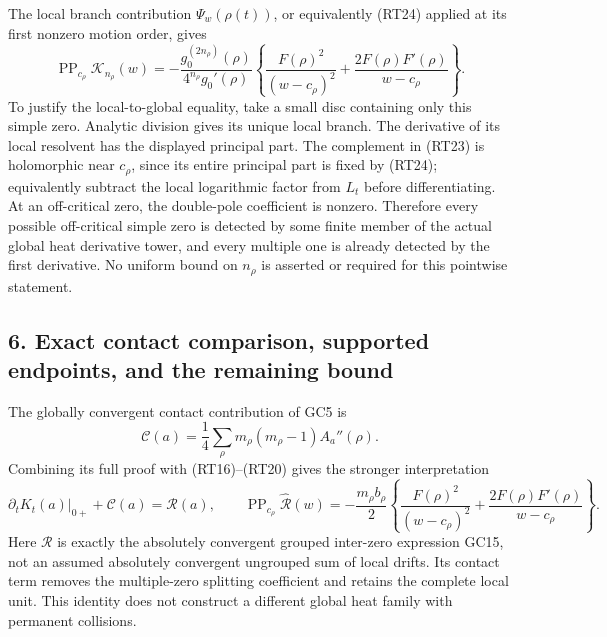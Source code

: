 \documentclass[
  10pt,
  a4paper,
]{article}
\begin{document}
The local branch contribution \(\Psi_w(\rho(t))\), or equivalently
(RT24) applied at its first nonzero motion order, gives \[
\operatorname{PP}_{c_\rho}\mathscr K_{n_\rho}(w)
=-\frac{g_0^{(2n_\rho)}(\rho)}{4^{n_\rho}g_0'(\rho)}
\left\{\frac{F(\rho)^2}{(w-c_\rho)^2}
+\frac{2F(\rho)F'(\rho)}{w-c_\rho}\right\}.
\tag{RT27}
\] To justify the local-to-global equality, take a small disc containing
only this simple zero. Analytic division gives its unique local branch.
The derivative of its local resolvent has the displayed principal part.
The complement in (RT23) is holomorphic near \(c_\rho\), since its
entire principal part is fixed by (RT24); equivalently subtract the
local logarithmic factor from \(L_t\) before differentiating. At an
off-critical zero, the double-pole coefficient is nonzero. Therefore
every possible off-critical simple zero is detected by some finite
member of the actual global heat derivative tower, and every multiple
one is already detected by the first derivative. No uniform bound on
\(n_\rho\) is asserted or required for this pointwise statement.

\subsection{6. Exact contact comparison, supported endpoints, and the
remaining
bound}\label{exact-contact-comparison-supported-endpoints-and-the-remaining-bound}

The globally convergent contact contribution of GC5 is \[
\mathcal C(a)=\frac14\sum_\rho m_\rho(m_\rho-1)A_a''(\rho).
\tag{RT28}
\] Combining its full proof with (RT16)--(RT20) gives the stronger
interpretation \[
\left.\partial_tK_t(a)\right|_{0+}+\mathcal C(a)=\mathcal R(a),
\qquad
\operatorname{PP}_{c_\rho}\widehat{\mathcal R}(w)
=-\frac{m_\rho b_\rho}{2}
\left\{\frac{F(\rho)^2}{(w-c_\rho)^2}
+\frac{2F(\rho)F'(\rho)}{w-c_\rho}\right\}.
\tag{RT29}
\] Here \(\mathcal R\) is exactly the absolutely convergent grouped
inter-zero expression GC15, not an assumed absolutely convergent
ungrouped sum of local drifts. Its contact term removes the
multiple-zero splitting coefficient and retains the complete local unit.
This identity does not construct a different global heat family with
permanent collisions.
\end{document}

